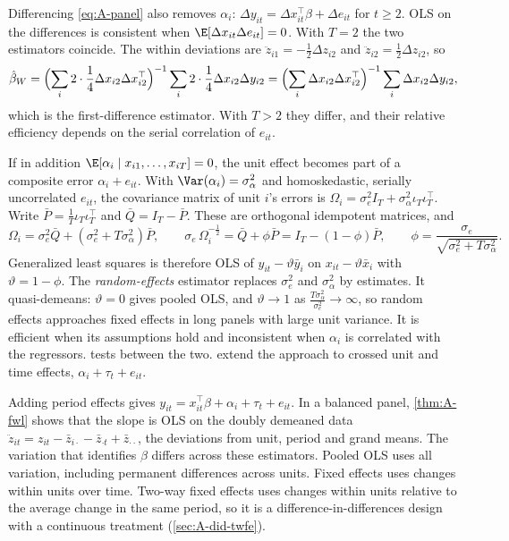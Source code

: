 Differencing \eqref{eq:A-panel} also removes $\alpha_i$: $\Delta y_{it} = \Delta x_{it}^\top\beta + \Delta e_{it}$
for $t \ge 2$. OLS on the differences is consistent when $\E[\Delta x_{it}\Delta e_{it}] = 0$. With $T = 2$ the two
estimators coincide. The within deviations are $\ddot z_{i1} = -\frac{1}{2}\Delta z_{i2}$ and
$\ddot z_{i2} = \frac{1}{2}\Delta z_{i2}$, so
\begin{equation*}
\hat\beta_W = \Bigl(\sum_i 2\cdot\frac{1}{4}\Delta x_{i2}\Delta x_{i2}^\top\Bigr)^{-1}\sum_i 2\cdot\frac{1}{4}\Delta x_{i2}\Delta y_{i2}
= \Bigl(\sum_i\Delta x_{i2}\Delta x_{i2}^\top\Bigr)^{-1}\sum_i\Delta x_{i2}\Delta y_{i2} ,
\end{equation*}
which is the first-difference estimator. With $T > 2$ they differ, and their relative efficiency depends on
the serial correlation of $e_{it}$.

If in addition $\E[\alpha_i \mid x_{i1}, \dots, x_{iT}] = 0$, the unit effect becomes part of a composite error
$\alpha_i + e_{it}$. With $\Var(\alpha_i) = \sigma_\alpha^2$ and homoskedastic, serially uncorrelated $e_{it}$,
the covariance matrix of unit $i$'s errors is $\Omega_i = \sigma_e^2I_T + \sigma_\alpha^2\iota_T\iota_T^\top$.
Write $\bar P = \frac{1}{T}\iota_T\iota_T^\top$ and $\bar Q = I_T - \bar P$. These are orthogonal idempotent
matrices, and
\begin{equation*}
\Omega_i = \sigma_e^2\bar Q + (\sigma_e^2 + T\sigma_\alpha^2)\bar P, \qquad
\sigma_e\,\Omega_i^{-\frac{1}{2}} = \bar Q + \phi\bar P = I_T - (1 - \phi)\bar P, \qquad
\phi = \frac{\sigma_e}{\sqrt{\sigma_e^2 + T\sigma_\alpha^2}} .
\end{equation*}
Generalized least squares is therefore OLS of $y_{it} - \vartheta\bar y_i$ on $x_{it} - \vartheta\bar x_i$ with
$\vartheta = 1 - \phi$. The \emph{random-effects} estimator replaces $\sigma_e^2$ and $\sigma_\alpha^2$ by estimates.
It quasi-demeans: $\vartheta = 0$ gives pooled OLS, and $\vartheta \to 1$ as
$\frac{T\sigma_\alpha^2}{\sigma_e^2} \to \infty$, so random effects approaches fixed effects in long panels
with large unit variance. It is efficient when its assumptions hold and inconsistent when $\alpha_i$ is
correlated with the regressors.  tests between the two. \citet{FullerBattese1974}
extend the approach to crossed unit and time effects, $\alpha_i + \tau_t + e_{it}$.

Adding period effects gives $y_{it} = x_{it}^\top\beta + \alpha_i + \tau_t + e_{it}$. In a balanced panel,
\cref{thm:A-fwl} shows that the slope is OLS on the doubly demeaned data
$\ddot z_{it} = z_{it} - \bar z_{i\cdot} - \bar z_{\cdot t} + \bar z_{\cdot\cdot}$, the deviations from unit,
period and grand means. The variation that identifies $\beta$ differs across these estimators. Pooled OLS
uses all variation, including permanent differences across units. Fixed effects uses changes within units
over time. Two-way fixed effects uses changes within units relative to the average change in the same period,
so it is a difference-in-differences design with a continuous treatment (\cref{sec:A-did-twfe}).

